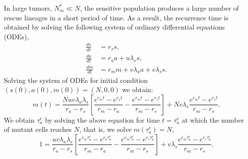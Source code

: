 \documentclass[12pt]{extarticle}
\newcommand{\e}{e}
\renewcommand{\Delta}{r}
\begin{document}
\begin{appendices}
In large tumors, $N_m^* \ll N$, the sensitive population produces a large number of rescue lineages in a short period of time.
As a result, the recurrence time is obtained by solving the following system of ordinary differential equations (ODEs),
\begin{equation}\label{detODE}
\begin{aligned}
\frac{ds}{dt}&=\Delta_ss,\\
\frac{da}{dt}&=\Delta_aa+u\lambda_ss,\\
\frac{dm}{dt}&=\Delta_mm+v\lambda_aa+v\lambda_ss.
\end{aligned}
\end{equation}
Solving the system of ODEs for initial condition $\left(s(0), a(0), m(0)\right)=\left(N,0,0\right)$ we obtain:
\begin{equation*} \label{m_t}
m(t) = \frac{N u v \lambda_a \lambda_s}{\Delta_a - \Delta_s}\left[ \frac{\e^{\Delta_m t} - \e^{\Delta_a t}}{\Delta_m - \Delta_a} - \frac{\e^{\Delta_m t} - \e^{\Delta_s t}}{\Delta_m - \Delta_s} \right] + N v \lambda_s \frac{\e^{\Delta_m t} - \e^{\Delta_s t}}{\Delta_m - \Delta_s}.
\end{equation*}
We obtain $\tau_a^r$ by solving the above equation for time $t=\tau_a^r$ at which the number of mutant cells reaches $N$, that is, we solve $m\left(\tau_a^r\right)=N$,
\begin{equation}\label{eq:t2det2024}
1 = \frac{u v \lambda_a \lambda_s}{\Delta_a - \Delta_s}\left[ \frac{\e^{\Delta_m \tau_a^r} - \e^{\Delta_a \tau_a^r}}{\Delta_m - \Delta_a} - \frac{\e^{\Delta_m \tau_a^r} - \e^{\Delta_s \tau_a^r}}{\Delta_m - \Delta_s} \right] + v \lambda_s \frac{\e^{\Delta_m \tau_a^r} - \e^{\Delta_s \tau_a^r}}{\Delta_m - \Delta_s}.
\end{equation}


\end{appendices}
\end{document}
